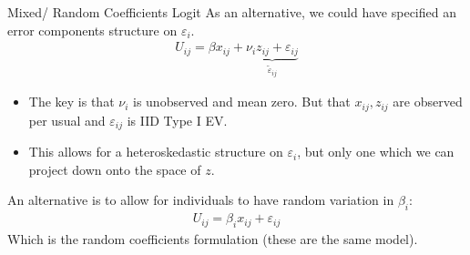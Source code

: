 \documentclass[aspectratio=169,11pt]{beamer}
\begin{document}
\begin{frame}{Mixed/ Random Coefficients Logit}
As an alternative, we could have specified an error components structure on $\varepsilon_i$.
\begin{eqnarray*}
U_{ij} = \beta x_{ij} + \underbrace{\nu_i z_{ij} + \varepsilon_{ij}}_{\tilde{\varepsilon}_{ij}}
\end{eqnarray*}
\begin{itemize}
\item The key is that $\nu_i$ is unobserved and mean zero. But that $x_{ij},z_{ij}$ are observed per usual and $\varepsilon_{ij}$ is IID Type I EV.
\item This allows for a heteroskedastic structure on $\varepsilon_{i}$, but only one which we can project down onto the space of $z$.
\end{itemize}
An alternative is to allow for individuals to have random variation in $\beta_i$:
\begin{eqnarray*}
U_{ij} = \beta_i x_{ij} +  \varepsilon_{ij}
\end{eqnarray*}
Which is the random coefficients formulation (these are the same model).
\end{frame}

%
\end{document}
